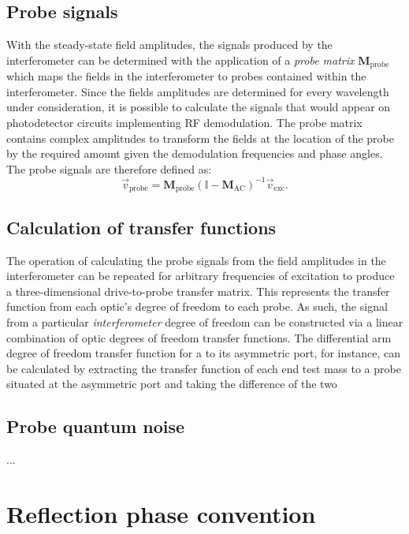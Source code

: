 \subsection{Probe signals}
With the steady-state field amplitudes, the signals produced by the interferometer can be determined with the application of a \emph{probe matrix} $\mathbf{M}_{\text{probe}}$ which maps the fields in the interferometer to probes contained within the interferometer. Since the fields amplitudes are determined for every wavelength under consideration, it is possible to calculate the signals that would appear on photodetector circuits implementing RF demodulation. The probe matrix contains complex amplitudes to transform the fields at the location of the probe by the required amount given the demodulation frequencies and phase angles. The probe signals are therefore defined as:
\begin{equation}
  \vec{v}_{\text{probe}} = \mathbf{M}_{\text{probe}} \left( \mathbb{I} - \mathbf{M}_{\text{AC}} \right)^{-1} \vec{v}_{\text{exc}}.
\end{equation}

\subsection{Calculation of transfer functions}
The operation of calculating the probe signals from the field amplitudes in the interferometer can be repeated for arbitrary frequencies of excitation to produce a three-dimensional drive-to-probe transfer matrix. This represents the transfer function from each optic's degree of freedom to each probe. As such, the signal from a particular \emph{interferometer} degree of freedom can be constructed via a linear combination of optic degrees of freedom transfer functions. The differential arm degree of freedom transfer function for a \MI to its asymmetric port, for instance, can be calculated by extracting the transfer function of each end test mass to a probe situated at the asymmetric port and taking the difference of the two 

\subsection{Probe quantum noise}
...

\section{Reflection phase convention}
\label{a:reflection-phase}
